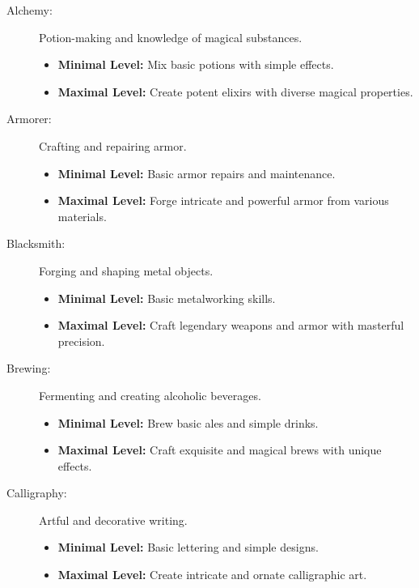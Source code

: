 \documentclass[12pt]{book}  %
\begin{document}
\begin{description}

    \item[Alchemy:] Potion-making and knowledge of magical substances.
        \begin{itemize}
            \item \textbf{Minimal Level:} Mix basic potions with simple effects.
            \item \textbf{Maximal Level:} Create potent elixirs with diverse magical properties.
        \end{itemize}

    \item[Armorer:] Crafting and repairing armor.
        \begin{itemize}
            \item \textbf{Minimal Level:} Basic armor repairs and maintenance.
            \item \textbf{Maximal Level:} Forge intricate and powerful armor from various materials.
        \end{itemize}

    \item[Blacksmith:] Forging and shaping metal objects.
        \begin{itemize}
            \item \textbf{Minimal Level:} Basic metalworking skills.
            \item \textbf{Maximal Level:} Craft legendary weapons and armor with masterful precision.
        \end{itemize}

    \item[Brewing:] Fermenting and creating alcoholic beverages.
        \begin{itemize}
            \item \textbf{Minimal Level:} Brew basic ales and simple drinks.
            \item \textbf{Maximal Level:} Craft exquisite and magical brews with unique effects.
        \end{itemize}

    \item[Calligraphy:] Artful and decorative writing.
        \begin{itemize}
            \item \textbf{Minimal Level:} Basic lettering and simple designs.
            \item \textbf{Maximal Level:} Create intricate and ornate calligraphic art.
        \end{itemize}


\end{description}
\end{document}
